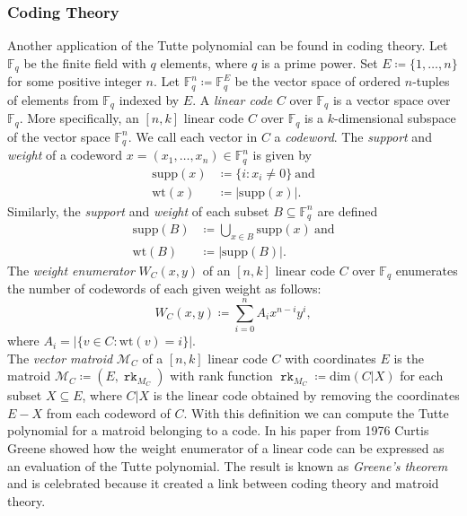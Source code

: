 \documentclass[12pt,a4paper, twoside, autooneside=false]{scrartcl}
\theoremstyle{definition}
\theoremstyle{remark}
\numberwithin{equation}{section}
\DeclareMathOperator{\rk}{\mathtt{rk}}
\newcommand{\M}{\mathcal{M}} %
\begin{document}
\subsubsection{Coding Theory} Another application of the Tutte polynomial can be found in coding theory. Let $\mathbb{F}_q$ be the finite field with $q$ elements, where $q$ is a prime power. Set $E \coloneqq \{1, \dots, n\}$ for some positive integer $n$. Let $\mathbb{F}_q^n \coloneqq \mathbb{F}_q^E$ be the vector space of ordered $n$-tuples of elements from $\mathbb{F}_q$ indexed by $E$. A \textit{linear code} $C$ over $\mathbb{F}_q$ is a vector space over $\mathbb{F}_q$. More specifically, an $[n,k]$ linear code $C$ over $\mathbb{F}_q$ is a $k$-dimensional subspace of the vector space $\mathbb{F}_q^n$. We call each vector in $C$ a \textit{codeword}. The \textit{support} and \textit{weight} of a codeword $x = (x_1, \dots, x_n) \in \mathbb{F}_q^n$ is given by 
\begin{align*}
\mathrm{supp}(x) &\coloneqq \{i : x_i \neq 0\}\ \text{and} \\ 
\mathrm{wt}(x) &\coloneqq |\mathrm{supp}(x)|. 
\end{align*}
Similarly, the \textit{support} and \textit{weight} of each subset $B \subseteq \mathbb{F}_q^n$ are defined
\begin{align*}
\mathrm{supp}(B) &\coloneqq \bigcup_{x \in B} \mathrm{supp}(x) \ \text{and}\\
\mathrm{wt}(B) &\coloneqq |\mathrm{supp}(B)|.
\end{align*}
The \textit{weight enumerator} $W_{C}(x,y)$ of an $[n,k]$ linear code $C$ over $\mathbb{F}_q$ enumerates the number of codewords of each given weight as follows: 
\[
W_C(x,y)\coloneqq \sum_{i = 0}^n A_i x^{n - i} y^i,
\]
where $A_i = |\{v \in C : \mathrm{wt}(v) = i\}|$. \\
\indent The \textit{vector matroid} $\M_C$ of a $[n,k]$ linear code $C$ with coordinates $E$ is the matroid $\M_C \coloneqq (E, \rk_{M_C})$ with rank function $\rk_{M_C}\coloneqq \mathrm{dim}(C|X)$ for each subset $X \subseteq E$, where $C|X$ is the linear code obtained by removing the coordinates $E - X$ from each codeword of $C$. With this definition we can compute the Tutte polynomial for a matroid belonging to a code. In his paper \cite{Gr1976} from 1976 Curtis Greene showed how the weight enumerator of a linear code can be expressed as an evaluation of the Tutte polynomial. The result is known as \textit{Greene's theorem} and is celebrated because it created a link between coding theory and matroid theory. \\
\end{document}
